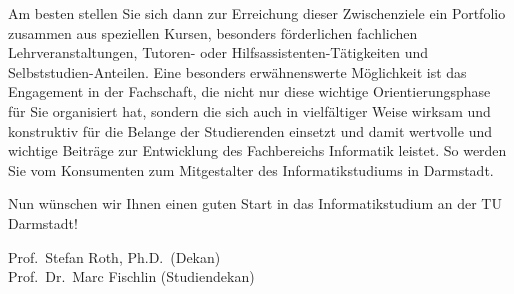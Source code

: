 {    Am besten stellen Sie sich dann zur Erreichung dieser Zwischenziele ein Portfolio zusammen aus speziellen Kursen, besonders förderlichen fachlichen Lehrveranstaltungen, Tutoren- oder Hilfsassistenten-Tätigkeiten und Selbststudien-Anteilen. Eine besonders erwähnenswerte Möglichkeit ist das Engagement in der Fachschaft, die nicht nur diese wichtige Orientierungsphase für Sie organisiert hat, sondern die sich auch in vielfältiger Weise wirksam und konstruktiv für die Belange der Studierenden einsetzt und damit wertvolle und wichtige Beiträge zur Entwicklung des Fachbereichs Informatik leistet. So werden Sie vom Konsumenten zum Mitgestalter des Informatikstudiums in Darmstadt.

    Nun wünschen wir Ihnen einen guten Start in das Informatikstudium an der TU Darmstadt!
}
{Prof.~Stefan Roth, Ph.D.~(Dekan) \\Prof.~Dr.~Marc Fischlin (Studiendekan)}

\newpage
